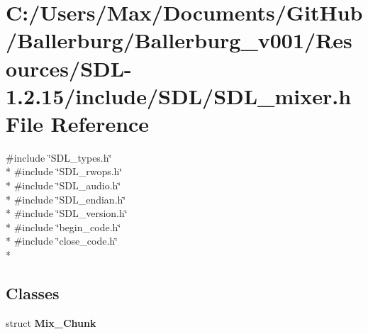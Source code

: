 \section{C\+:/\+Users/\+Max/\+Documents/\+Git\+Hub/\+Ballerburg/\+Ballerburg\+\_\+v001/\+Resources/\+S\+D\+L-\/1.2.15/include/\+S\+D\+L/\+S\+D\+L\+\_\+mixer.h File Reference}
\label{_s_d_l__mixer_8h}
{\ttfamily \#include \char`\"{}S\+D\+L\+\_\+types.\+h\char`\"{}}\\*
{\ttfamily \#include \char`\"{}S\+D\+L\+\_\+rwops.\+h\char`\"{}}\\*
{\ttfamily \#include \char`\"{}S\+D\+L\+\_\+audio.\+h\char`\"{}}\\*
{\ttfamily \#include \char`\"{}S\+D\+L\+\_\+endian.\+h\char`\"{}}\\*
{\ttfamily \#include \char`\"{}S\+D\+L\+\_\+version.\+h\char`\"{}}\\*
{\ttfamily \#include \char`\"{}begin\+\_\+code.\+h\char`\"{}}\\*
{\ttfamily \#include \char`\"{}close\+\_\+code.\+h\char`\"{}}\\*
\subsection*{Classes}
\begin{DoxyCompactItemize}
\item 
struct {\bf Mix\+\_\+\+Chunk}
\end{DoxyCompactItemize}
